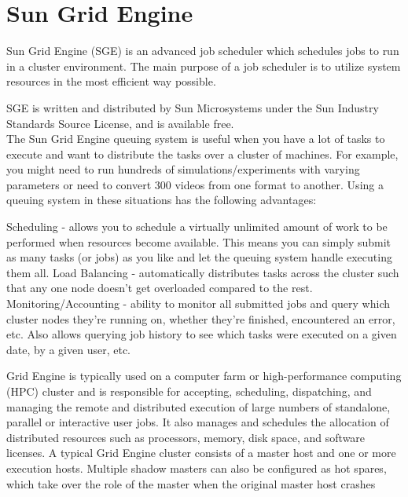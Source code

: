 \cleardoublepage
{}
\chapter{Sun Grid Engine}
Sun Grid Engine (SGE) is an advanced job scheduler which schedules jobs to run in a cluster environment. The main purpose of a job scheduler is to utilize system resources in the most efficient way possible.

SGE is written and distributed by Sun Microsystems under the Sun Industry Standards Source License, and is available free. \\
The Sun Grid Engine queuing system is useful when you have a lot of tasks to execute and want to distribute the tasks over a cluster of machines. For example, you might need to run hundreds of simulations/experiments with varying parameters or need to convert 300 videos from one format to another. Using a queuing system in these situations has the following advantages:

    Scheduling - allows you to schedule a virtually unlimited amount of work to be performed when resources become available. This means you can simply submit as many tasks (or jobs) as you like and let the queuing system handle executing them all.
    Load Balancing - automatically distributes tasks across the cluster such that any one node doesn’t get overloaded compared to the rest.
    Monitoring/Accounting - ability to monitor all submitted jobs and query which cluster nodes they’re running on, whether they’re finished, encountered an error, etc. Also allows querying job history to see which tasks were executed on a given date, by a given user, etc.


Grid Engine is typically used on a computer farm or high-performance computing (HPC) cluster and is responsible for accepting, scheduling, dispatching, and managing the remote and distributed execution of large numbers of standalone, parallel or interactive user jobs. It also manages and schedules the allocation of distributed resources such as processors, memory, disk space, and software licenses.
A typical Grid Engine cluster consists of a master host and one or more execution hosts. Multiple shadow masters can also be configured as hot spares, which take over the role of the master when the original master host crashes

    
   
    
